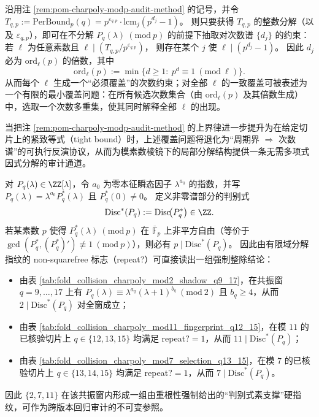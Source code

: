 \begin{remark}\label{rem:pom-charpoly-modp-degree-inversion}
沿用注 \ref{rem:pom-charpoly-modp-audit-method} 的记号，并令
\(
T_{q,p}:=\mathrm{PerBound}_p(q)=p^{\varepsilon_{q,p}}\cdot \mathrm{lcm}_j(p^{d_j}-1)
\)。
则只要获得 \(T_{q,p}\) 的整数分解（以及 \(\varepsilon_{q,p}\)），即可在不分解 \(P_q(\lambda)\ (\mathrm{mod}\ p)\) 的前提下抽取对次数谱 \(\{d_j\}\) 的约束：
若 \(\ell\) 为任意素数且
\(
\ell\mid (T_{q,p}/p^{\varepsilon_{q,p}})
\)，
则存在某个 \(j\) 使
\(
\ell\mid (p^{d_j}-1)
\)。
因此 \(d_j\) 必为 \(\mathrm{ord}_\ell(p)\) 的倍数，其中
\[
\mathrm{ord}_\ell(p):=\min\{d\ge 1:\ p^d\equiv 1\ (\mathrm{mod}\ \ell)\}.
\]
从而每个 \(\ell\) 生成一个“必须覆盖”的次数约束；对全部 \(\ell\) 的一致覆盖可被表述为一个有限的最小覆盖问题：在所有候选次数集合（由 \(\mathrm{ord}_\ell(p)\) 及其倍数生成）中，选取一个次数多重集，使其同时解释全部 \(\ell\) 的出现。
\par
当把注 \ref{rem:pom-charpoly-modp-audit-method} 的上界律进一步提升为在给定切片上的紧致等式（tight bound）时，上述覆盖问题将退化为“周期界 \(\Rightarrow\) 次数谱”的可执行反演协议，从而为模素数棱镜下的局部分解结构提供一条无需多项式因式分解的审计通道。
\end{remark}

\begin{remark}[判别式的素支撑指纹：repeat? \texorpdfstring{$\Rightarrow$}{=>} \texorpdfstring{$p$}{p}-整除性（可审计）]\label{rem:pom-discriminant-prime-support}
对 \(P_q(\lambda)\in\ZZ[\lambda]\)，令 \(a_0\) 为零本征瞬态因子 \(\lambda^{a_0}\) 的指数，并写
\(
P_q(\lambda)=\lambda^{a_0}P_q^\ast(\lambda)
\)
且 \(P_q^\ast(0)\ne 0\)。
定义非零谱部分的判别式
\[
\mathrm{Disc}^\ast(P_q):=\mathrm{Disc}\!\bigl(P_q^\ast\bigr)\in\ZZ.
\]
若某素数 \(p\) 使得 \(P_q^\ast(\lambda)\ (\mathrm{mod}\ p)\) 在 \(\overline{\mathbb{F}}_p\) 上非平方自由（等价于 \(\gcd(P_q^\ast,(P_q^\ast)')\not\equiv 1\ (\mathrm{mod}\ p)\)），则必有 \(p\mid \mathrm{Disc}^\ast(P_q)\)。
因此由有限域分解指纹的 non-squarefree 标志（repeat?）可直接读出一组强制整除结论：
\begin{itemize}
  \item 由表 \ref{tab:fold_collision_charpoly_mod2_shadow_q9_17}，在共振窗 \(q=9,\dots,17\) 上有
  \(P_q(\lambda)\equiv \lambda^{a_q}(\lambda+1)^{b_q}\ (\mathrm{mod}\ 2)\) 且 \(b_q\ge 4\)，从而 \(2\mid \mathrm{Disc}^\ast(P_q)\) 对全窗成立；
  \item 由表 \ref{tab:fold_collision_charpoly_mod11_fingerprint_q12_15}，在模 \(11\) 的已核验切片上 \(q\in\{12,13,15\}\) 均满足 repeat?\(=1\)，从而 \(11\mid \mathrm{Disc}^\ast(P_q)\)；
  \item 由表 \ref{tab:fold_collision_charpoly_mod7_selection_q13_15}，在模 \(7\) 的已核验切片上 \(q\in\{13,14,15\}\) 均满足 repeat?\(=1\)，从而 \(7\mid \mathrm{Disc}^\ast(P_q)\)。
\end{itemize}
因此 \(\{2,7,11\}\) 在该共振窗内形成一组由重根性强制给出的“判别式素支撑”硬指纹，可作为跨版本回归审计的不可变参照。
\end{remark}

